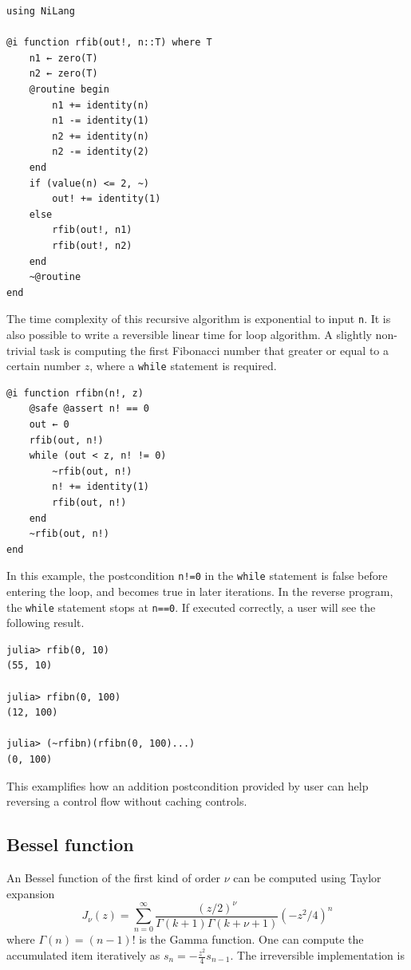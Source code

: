 \documentclass[aps,twocolumn,longbibliography,english,superscriptaddress]{revtex4-1}
\newcommand{\<}{\langle}
\renewcommand{\>}{\rangle}
\theoremstyle{definition}\newtheorem{definition}{\textit{Definition}}
\begin{document}
\begin{minipage}{.44\textwidth}
\begin{lstlisting}
using NiLang

@i function rfib(out!, n::T) where T
    n1 ← zero(T)
    n2 ← zero(T)
    @routine begin
        n1 += identity(n)
        n1 -= identity(1)
        n2 += identity(n)
        n2 -= identity(2)
    end
    if (value(n) <= 2, ~)
        out! += identity(1)
    else
        rfib(out!, n1)
        rfib(out!, n2)
    end
    ~@routine
end
\end{lstlisting}
\end{minipage}

The time complexity of this recursive algorithm is exponential to input \texttt{n}. It is also possible to write a reversible linear time for loop algorithm.
A slightly non-trivial task is computing the first Fibonacci number that greater or equal to a certain number $z$, where a \texttt{while} statement is required.

\begin{minipage}{.44\textwidth}
\begin{lstlisting}
@i function rfibn(n!, z)
    @safe @assert n! == 0
    out ← 0
    rfib(out, n!)
    while (out < z, n! != 0)
        ~rfib(out, n!)
        n! += identity(1)
        rfib(out, n!)
    end
    ~rfib(out, n!)
end
\end{lstlisting}
\end{minipage}

In this example, the postcondition \texttt{n!=0} in the \texttt{while} statement is false before entering the loop, and becomes true in later iterations. In the reverse program, the \texttt{while} statement stops at \texttt{n==0}.
If executed correctly, a user will see the following result.

\begin{minipage}{.44\textwidth}
\begin{lstlisting}
julia> rfib(0, 10)
(55, 10)

julia> rfibn(0, 100)
(12, 100)

julia> (~rfibn)(rfibn(0, 100)...)
(0, 100)
\end{lstlisting}
\end{minipage}

This examplifies how an addition postcondition provided by user can help reversing a control flow without caching controls.

\subsection{Bessel function}\label{sec:bessel}
An Bessel function of the first kind of order $\nu$ can be computed using Taylor expansion
\begin{equation}
    J_\nu(z) = \sum\limits_{n=0}^{\infty} \frac{(z/2)^\nu}{\Gamma(k+1)\Gamma(k+\nu+1)} (-z^2/4)^{n}
\end{equation}
where $\Gamma(n) = (n-1)!$ is the Gamma function. One can compute the accumulated item iteratively as $s_n = -\frac{z^2}{4} s_{n-1}$. The irreversible implementation is
\end{document}
